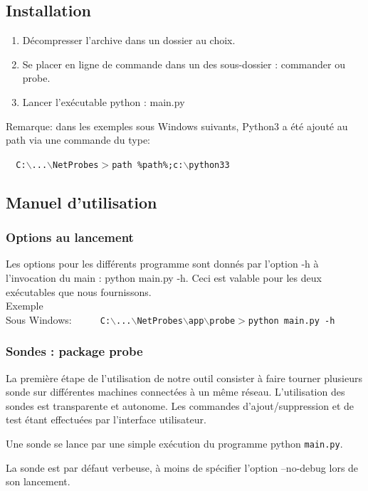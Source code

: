\documentclass[a4paper,11pt]{article}
\begin{document}
\subsection{Installation}
\begin{enumerate}
\item Décompresser l'archive dans un dossier au choix.
\item Se placer en ligne de commande dans un des sous-dossier : commander ou probe.
\item Lancer l'exécutable python : main.py
\end{enumerate}
Remarque: dans les exemples sous Windows suivants, Python3 a été ajouté au path via une commande du type:
\begin{center} \texttt{ { \color{blue}C:$\backslash$...$\backslash$NetProbes$>$}path \%path\%;c:$\backslash$python33} \end{center}

\subsection{Manuel d'utilisation}

\subsubsection{Options au lancement}
Les options pour les différents programme sont donnés par l'option -h à l'invocation du main : python main.py -h.
Ceci est valable pour les deux exécutables que nous fournissons.\\
Exemple\\
Sous Windows: \ \ \ \texttt{ { \color{blue}C:$\backslash$...$\backslash$NetProbes$\backslash$app$\backslash$probe$>$}python main.py -h}

\subsubsection{Sondes : package probe}
La première étape de l'utilisation de notre outil consister à faire tourner plusieurs sonde sur différentes machines connectées à un même réseau. L'utilisation des sondes est transparente et autonome. Les commandes d'ajout/suppression et de test étant effectuées par l'interface utilisateur.

Une sonde se lance par une simple exécution du programme python \texttt{main.py}.

La sonde est par défaut verbeuse, à moins de spécifier l'option --no-debug lors de son lancement.
\end{document}
